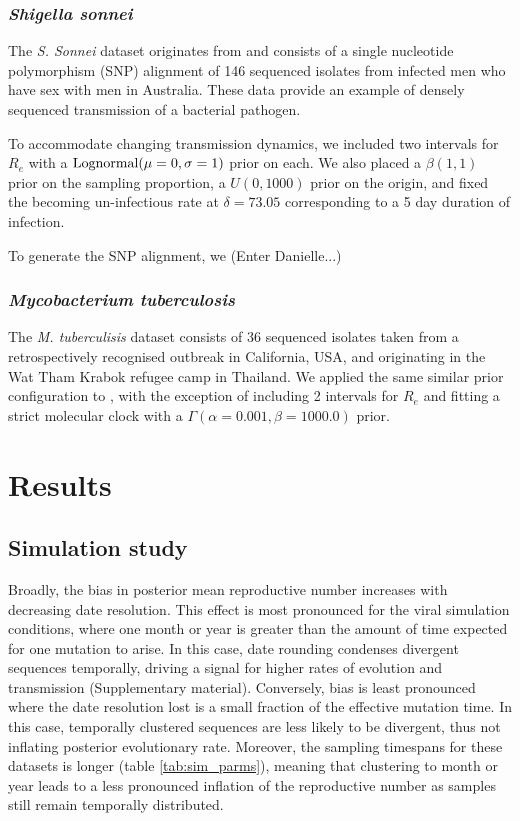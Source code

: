 \documentclass{article}
\begin{document}
\begin{spacing}{1.5}
\subsubsection*{\textit{Shigella sonnei}}
The \textit{S. Sonnei} dataset originates from \citet{ingle_co-circulation_2019} and consists of a single nucleotide polymorphism (SNP) alignment of 146 sequenced isolates from infected men who have sex with men in Australia. These data provide an example of densely sequenced transmission of a bacterial pathogen. 

To accommodate changing transmission dynamics, we included two intervals for $R_e$ with a $\textnormal{Lognormal}(\mu=0,\sigma=1)$ prior on each. We also placed a $\beta(1,1)$ prior on the sampling proportion, a $U(0,1000)$ prior on the origin, and fixed the becoming un-infectious rate at $\delta=73.05$ corresponding to a 5 day duration of infection.

To generate the SNP alignment, we (Enter Danielle...)

\subsubsection*{\textit{Mycobacterium tuberculosis}}
The \textit{M. tuberculisis} dataset consists of 36 sequenced isolates taken from a retrospectively recognised outbreak in California, USA, and originating in the Wat Tham Krabok refugee camp in Thailand. We applied the same similar prior configuration to \citet{kuhnert_tuberculosis_2018}, with the exception of including 2 intervals for $R_e$ and fitting a strict molecular clock with a $\Gamma(\alpha=0.001,\beta=1000.0)$ prior.


\section*{Results}
\subsection*{Simulation study}
Broadly, the bias in posterior mean reproductive number increases with decreasing date resolution. This effect is most pronounced for the viral simulation conditions, where one month or year is greater than the amount of time expected for one mutation to arise. In this case, date rounding condenses divergent sequences temporally, driving a signal for higher rates of evolution and transmission (Supplementary material). Conversely, bias is least pronounced where the date resolution lost is a small fraction of the effective mutation time. In this case, temporally clustered sequences are less likely to be divergent, thus not inflating posterior evolutionary rate. Moreover, the sampling timespans for these datasets is longer (table \ref{tab:sim_parms}), meaning that clustering to month or year leads to a less pronounced inflation of the reproductive number as samples still remain temporally distributed.


\end{spacing}
\end{document}
